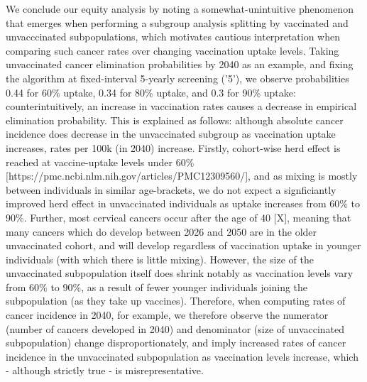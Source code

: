 We conclude our equity analysis by noting a somewhat-unintuitive phenomenon that emerges when performing a subgroup analysis splitting by vaccinated and unvacccinated subpopulations, which motivates cautious interpretation when comparing such cancer rates over changing vaccination uptake levels. Taking unvaccinated cancer elimination probabilities by 2040 as an example, and fixing the algorithm at fixed-interval 5-yearly screening ('5'), we observe probabilities 0.44 for 60\% uptake, 0.34 for 80\% uptake, and 0.3 for 90\% uptake: counterintuitively, an increase in vaccination rates causes a decrease in empirical elimination probability. This is explained as follows: although absolute cancer incidence does decrease in the unvaccinated subgroup as vaccination uptake increases, rates per 100k (in 2040) increase. Firstly, cohort-wise herd effect is reached at vaccine-uptake levels under 60\% [https://pmc.ncbi.nlm.nih.gov/articles/PMC12309560/], and as mixing is mostly between individuals in similar age-brackets, we do not expect a signficiantly improved herd effect in unvaccinated individuals as uptake increases from 60\% to 90\%. Further, most cervical cancers occur after the age of 40 [X], meaning that many cancers which do develop between 2026 and 2050 are in the older unvaccinated cohort, and will develop regardless of vaccination uptake in younger individuals (with which there is little mixing). However, the size of the unvaccinated subpopulation itself does shrink notably as vaccination levels vary from 60\% to 90\%, as a result of fewer younger individuals joining the subpopulation (as they take up vaccines). Therefore, when computing rates of cancer incidence in 2040, for example, we therefore observe the numerator (number of cancers developed in 2040) and denominator (size of unvaccinated subpopulation) change disproportionately, and imply increased rates of cancer incidence in the unvaccinated subpopulation as vaccination levels increase, which - although strictly true - is misrepresentative.




